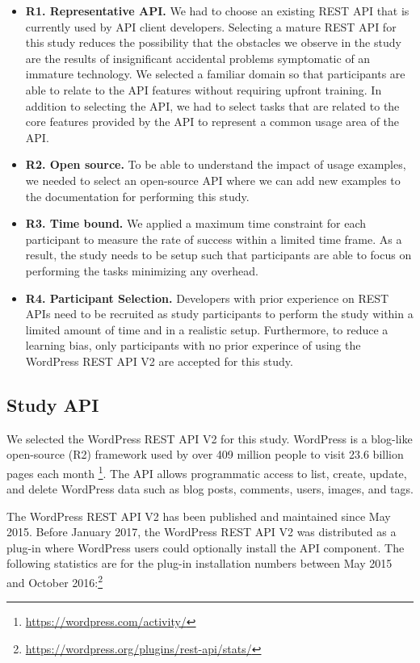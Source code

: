 \documentclass[conference]{IEEEtran}
\begin{document}
\begin{itemize}
  \item \textbf{R1. Representative API.} We had to choose an existing REST API that is currently used by API client developers. Selecting a mature REST API for this study reduces the possibility that the obstacles we observe in the study are the results of insignificant accidental problems symptomatic of an immature technology. We selected a familiar domain so that participants are able to relate to the API features without requiring upfront training. In addition to selecting the API, we had to select tasks that are related to the core features provided by the API to represent a common usage area of the API.
  \item \textbf{R2. Open source.} To be able to understand the impact of usage examples, we needed to select an open-source API where we can add new examples to the documentation for performing this study.
  \item \textbf{R3. Time bound.} We applied a maximum time constraint for each participant to measure the rate of success within a limited time frame. As a result, the study needs to be setup such that participants are able to focus on performing the tasks minimizing any overhead.
  \item \textbf{R4. Participant Selection.} Developers with prior experience on REST APIs need to be recruited as study participants to perform the study within a limited amount of time and in a realistic setup. Furthermore, to reduce a learning bias, only participants with no prior experince of using the WordPress REST API V2 are accepted for this study.
\end{itemize}


\subsection{Study API} %

We selected the WordPress REST API V2 for this study. WordPress is a blog-like open-source (R2) framework used by over 409 million people to visit 23.6 billion pages each month \footnote{\url{https://wordpress.com/activity/}}. The API allows programmatic access to list, create, update, and delete WordPress data such as blog posts, comments, users, images, and tags.

The WordPress REST API V2 has been published and maintained since May 2015. Before January 2017, the WordPress REST API V2 was distributed as a plug-in where WordPress users could optionally install the API component. The following statistics are for the plug-in installation numbers between May 2015 and October 2016:\footnote{\url{https://wordpress.org/plugins/rest-api/stats/}}
\end{document}
